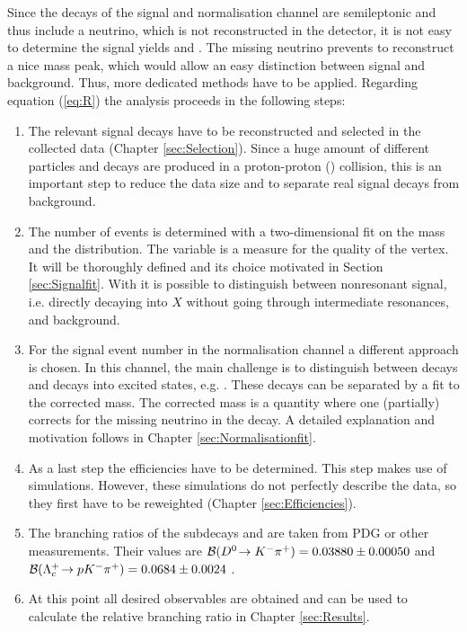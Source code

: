 Since the decays of the signal and normalisation channel are semileptonic and thus include a neutrino, which is not reconstructed in the detector, it is not easy to determine the signal yields \NDp and \NLc.
The missing neutrino prevents to reconstruct a nice \Lb mass peak, which would allow an easy distinction between signal and background.
Thus, more dedicated methods have to be applied.
Regarding equation (\ref{eq:R}) the analysis proceeds in the following steps:
\begin{enumerate}
    \item The relevant signal decays have to be reconstructed and selected in the collected data (Chapter \ref{sec:Selection}). 
          Since a huge amount of different particles and decays are produced in a proton-proton (\proton\proton) collision, this is an important step to reduce the data size and to separate real signal decays from background.
    \item The number of \LbToDpmunuX events \NLc is determined with a two-dimensional fit on the \Dz\proton mass and the \logIP distribution.
          The variable \logIP  is a measure for the quality of the \Dz\proton\mun vertex.
          It will be thoroughly defined and its choice motivated in Section \ref{sec:Signalfit}.
          With \logIP it is possible to distinguish between nonresonant signal, i.e. \Lb directly decaying into \Dz\proton\mun\neumb$X$ without going through intermediate resonances, and background.
    \item For the signal event number \NLc in the normalisation channel \LbToLcmunu a different approach is chosen.
          In this channel, the main challenge is to distinguish between \LbToLcmunu decays and decays into excited \Lc states, e.g. .
          These decays can be separated by a fit to the corrected \Lb mass.
          The corrected mass is a quantity where one (partially) corrects for the missing neutrino in the decay.
          A detailed explanation and motivation follows in Chapter \ref{sec:Normalisationfit}.
    \item As a last step the efficiencies have to be determined.
          This step makes use of simulations.
          However, these simulations do not perfectly describe the data, so they first have to be reweighted (Chapter \ref{sec:Efficiencies}).
    \item The branching ratios of the subdecays \DToKpi and \LcTopKpi are taken from PDG or other measurements. 
          Their values are ${\cal B}({{D}^0}\!\rightarrow {\ensuremath{{K}^-}}{\ensuremath{{\pi}^+}}) = 0.03880 \pm 0.00050$ \cite{PDG} and ${\cal B}({{\Lambda}^+_{c}}\!\rightarrow {\ensuremath{p}}{\ensuremath{{K}^-}}{\ensuremath{{\pi}^+}}) = 0.0684 \pm 0.0024$ \cite{Belle_BR_LcTopKpi}.
    \item At this point all desired observables are obtained and can be used to calculate the relative branching ratio \R in Chapter \ref{sec:Results}.
\end{enumerate}

